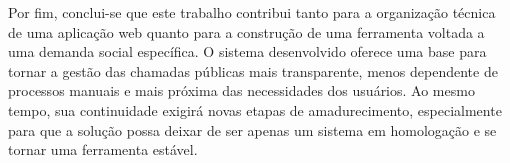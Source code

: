 \documentclass[grad,pdftex]{poli}
\begin{document}
Por fim, conclui-se que este trabalho contribui tanto para a organização técnica de uma aplicação web quanto para a construção de uma ferramenta voltada a uma demanda social específica. O sistema desenvolvido oferece uma base para tornar a gestão das chamadas públicas mais transparente, menos dependente de processos manuais e mais próxima das necessidades dos usuários. Ao mesmo tempo, sua continuidade exigirá novas etapas de amadurecimento, especialmente para que a solução possa deixar de ser apenas um sistema em homologação e se tornar uma ferramenta estável.


\clearpage{}
  \backmatter
  \nocite{*}
  
  
  \appendix
  
\end{document}
